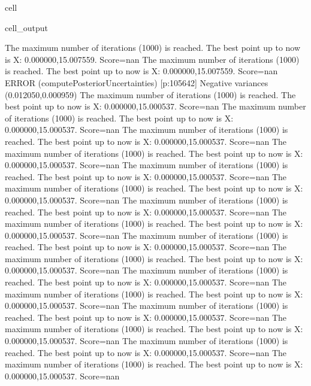 \documentclass[letterpaper,10pt,english]{jupyterBook}
\begin{document}
\begin{sphinxuseclass}{cell}
\begin{sphinxVerbatimOutput}
\begin{sphinxuseclass}{cell_output}
\begin{sphinxVerbatim}[commandchars=\\\{\}]
The maximum number of iterations (1000) is reached. The best point up to now is X: \PYGZob{}0.000000,15.007559\PYGZcb{}. Score=\PYGZhy{}nan
The maximum number of iterations (1000) is reached. The best point up to now is X: \PYGZob{}0.000000,15.007559\PYGZcb{}. Score=\PYGZhy{}nan
ERROR (compute\PYGZus{}Posterior\PYGZus{}Uncertainties) [p:105642] Negative variances (0.012050,\PYGZhy{}0.000959)
The maximum number of iterations (1000) is reached. The best point up to now is X: \PYGZob{}0.000000,15.000537\PYGZcb{}. Score=\PYGZhy{}nan
The maximum number of iterations (1000) is reached. The best point up to now is X: \PYGZob{}0.000000,15.000537\PYGZcb{}. Score=\PYGZhy{}nan
The maximum number of iterations (1000) is reached. The best point up to now is X: \PYGZob{}0.000000,15.000537\PYGZcb{}. Score=\PYGZhy{}nan
The maximum number of iterations (1000) is reached. The best point up to now is X: \PYGZob{}0.000000,15.000537\PYGZcb{}. Score=\PYGZhy{}nan
The maximum number of iterations (1000) is reached. The best point up to now is X: \PYGZob{}0.000000,15.000537\PYGZcb{}. Score=\PYGZhy{}nan
The maximum number of iterations (1000) is reached. The best point up to now is X: \PYGZob{}0.000000,15.000537\PYGZcb{}. Score=\PYGZhy{}nan
The maximum number of iterations (1000) is reached. The best point up to now is X: \PYGZob{}0.000000,15.000537\PYGZcb{}. Score=\PYGZhy{}nan
The maximum number of iterations (1000) is reached. The best point up to now is X: \PYGZob{}0.000000,15.000537\PYGZcb{}. Score=\PYGZhy{}nan
The maximum number of iterations (1000) is reached. The best point up to now is X: \PYGZob{}0.000000,15.000537\PYGZcb{}. Score=\PYGZhy{}nan
The maximum number of iterations (1000) is reached. The best point up to now is X: \PYGZob{}0.000000,15.000537\PYGZcb{}. Score=\PYGZhy{}nan
The maximum number of iterations (1000) is reached. The best point up to now is X: \PYGZob{}0.000000,15.000537\PYGZcb{}. Score=\PYGZhy{}nan
The maximum number of iterations (1000) is reached. The best point up to now is X: \PYGZob{}0.000000,15.000537\PYGZcb{}. Score=\PYGZhy{}nan
The maximum number of iterations (1000) is reached. The best point up to now is X: \PYGZob{}0.000000,15.000537\PYGZcb{}. Score=\PYGZhy{}nan
The maximum number of iterations (1000) is reached. The best point up to now is X: \PYGZob{}0.000000,15.000537\PYGZcb{}. Score=\PYGZhy{}nan
The maximum number of iterations (1000) is reached. The best point up to now is X: \PYGZob{}0.000000,15.000537\PYGZcb{}. Score=\PYGZhy{}nan
The maximum number of iterations (1000) is reached. The best point up to now is X: \PYGZob{}0.000000,15.000537\PYGZcb{}. Score=\PYGZhy{}nan

\end{sphinxVerbatim}
\end{sphinxuseclass}
\end{sphinxVerbatimOutput}
\end{sphinxuseclass}
\end{document}
